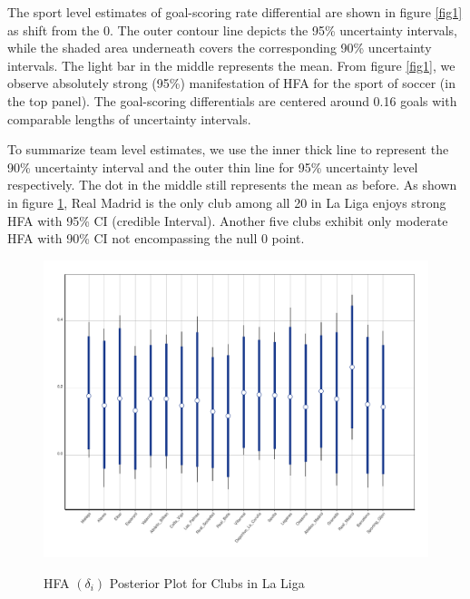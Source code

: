 \documentclass[]{interact}
\theoremstyle{plain}%
\theoremstyle{definition}
\theoremstyle{remark}
\begin{document}
The sport level estimates of goal-scoring rate differential are shown in figure \ref{fig1} as shift from the 0. The outer contour line depicts the 95\% uncertainty intervals, while the shaded area underneath covers the corresponding 90\% uncertainty intervals. The light bar in the middle represents the mean. From figure \ref{fig1}, we observe absolutely strong (95\%) manifestation of HFA for the sport of soccer (in the top panel). The goal-scoring differentials are centered around 0.16 goals with comparable lengths of uncertainty intervals. 


 
To summarize team level estimates, we use the inner thick line to represent the 90\% uncertainty interval and the outer thin line for 95\% uncertainty level respectively. The dot in the middle still represents the mean as before. As shown in figure \ref{fig2}, Real Madrid is the only club among all 20 in La Liga enjoys strong HFA with 95\% CI (credible Interval). Another five clubs exhibit only moderate HFA with 90\% CI not encompassing the null 0 point.  

\begin{figure}
	{\includegraphics[width=0.9\linewidth]{HFA_Posterior_La_Liga.pdf}}
	\caption{HFA $(\delta_i)$ Posterior Plot for Clubs in La Liga}	
	\label{fig2}
\end{figure}
\end{document}
